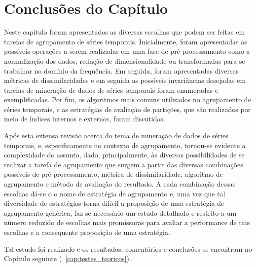 


\section{Conclusões do Capítulo}

Neste capítulo foram apresentados as diversas escolhas que podem ser feitas em tarefas de agrupamento de séries temporais. Inicialmente, foram apresentadas as possíveis operações a serem realizadas em uma fase de pré-processamento como a normalização dos dados, redução de dimensionalidade ou transformadas para se trabalhar no domínio da frequência. Em seguida, foram apresentadas diversas métricas de dissimilaridades e em seguida as possíveis invariâncias desejadas em tarefas de mineração de dados de séries temporais foram enumeradas e exemplificadas. Por fim, os algoritmos mais comuns utilizados no agrupamento de séries temporais, e as estratégias de avaliação de partições, que são realizados por meio de índices internos e externos, foram discutidas.

Após esta extensa revisão acerca do tema de mineração de dados de séries temporais, e, especificamente no contexto de agrupamento, tornou-se evidente a complexidade do assunto, dado, principalmente, às diversas possibilidades de se realizar a tarefa de agrupamento que surgem a partir das diversas combinações possíveis de pré-processamento, métrica de dissimilaridade, algoritmo de agrupamento e método de avaliação do resultado. A cada combinação dessas escolhas dá-se o o nome de estratégia de agrupamento e, uma vez que tal diversidade de estratégias torna difícil a proposição de uma estratégia de agrupamento genérica, faz-se necessário um estudo detalhado e restrito a um número reduzido de escolhas mais promissoras para avaliar a performance de tais escolhas e a consequente proposição de uma estratégia.

Tal estudo foi realizado e os resultados, comentários e conclusões se encontram no Capítulo seguinte (~\ref{cap:testes_teoricos}).
